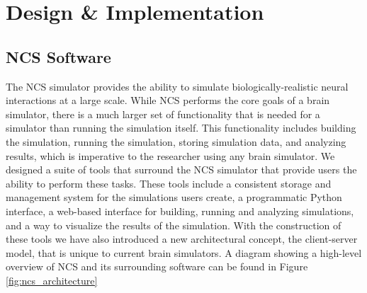 \chapter{Design \& Implementation}
\label{chapter:design}

\section{NCS Software}

The NCS simulator provides the ability to simulate biologically-realistic neural interactions at a large scale. While NCS performs the core goals of a brain simulator, there is a much larger set of functionality that is needed for a simulator than running the simulation itself. This functionality includes building the simulation, running the simulation, storing simulation data, and analyzing results, which is imperative to the researcher using any brain simulator. We designed a suite of tools that surround the NCS simulator that provide users the ability to perform these tasks. These tools include a consistent storage and management system for the simulations users create, a programmatic Python interface, a web-based interface for building, running and analyzing simulations, and a way to visualize the results of the simulation. With the construction of these tools we have also introduced a new architectural concept, the client-server model, that is unique to current brain simulators. A diagram showing a high-level overview of NCS and its surrounding software can be found in Figure \ref{fig:ncs_architecture}

